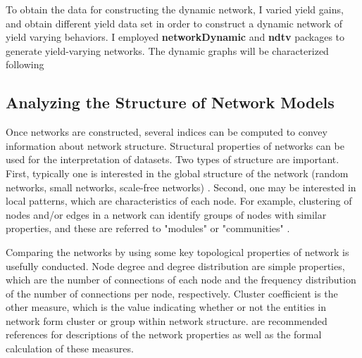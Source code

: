 To obtain the data for constructing the dynamic network, I varied yield gains, and obtain different yield data set in order to construct a dynamic network of yield varying behaviors. I employed \textbf{networkDynamic}  and \textbf{ndtv}  packages to generate yield-varying networks. The dynamic graphs will be characterized following 

\subsection*{Analyzing the Structure of Network Models}

Once networks are constructed, several indices can be computed to convey information about network structure. Structural properties of networks can be used for the interpretation of datasets. Two types of structure are important. First, typically one is interested in the global structure of the network (random networks, small networks, scale-free networks) . Second, one may be interested in local patterns, which are characteristics of each node. For example, clustering of nodes and/or edges in a network can identify groups of nodes with similar properties, and these are referred to "modules" or "communities" .

Comparing the networks by using some key topological properties of network is usefully conducted. Node degree and degree distribution are simple properties, which are the number of connections of each node and the frequency distribution of the number of connections per node, respectively. Cluster coefficient is the other measure, which is the value indicating whether or not the entities in network form cluster or group within network structure.  are recommended references for descriptions of the network properties as well as the formal calculation of these measures.


